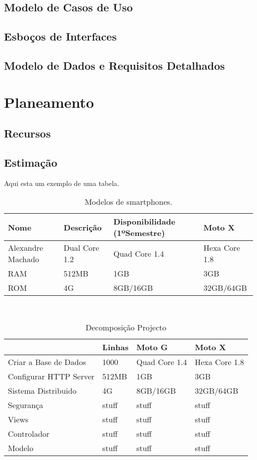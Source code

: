 \documentclass[12pt, a4paper, twoside]{report} %
\begin{document}
\section{Modelo de Casos de Uso}

\section{Esboços de Interfaces}

\section{Modelo de Dados e Requisitos Detalhados}

\chapter{Planeamento}

\section{Recursos}

\section{Estimação}

Aqui esta um exemplo de uma tabela.

\begin{table}[h]
\centering
\begin{tabular}{|l|l|l|l|}
\hline
{Nome} & {Descrição} & {Disponibilidade} (1ºSemestre) & {Moto X}\\ \hline
{Alexandre Machado} & Dual Core 1.2 & Quad Core 1.4 & Hexa Core 1.8\\ \hline
{RAM} & 512MB & 1GB & 3GB\\ \hline
{ROM} & 4G & 8GB/16GB & 32GB/64GB\\ \hline
\end{tabular} \\
\caption{Modelos de smartphones.}
\end{table}

\begin{table}[h]
\centering
\begin{tabular}{|l|l|l|l|}
\hline
& {Linhas} & {Moto G} & {Moto X}\\ \hline
{Criar a Base de Dados} & 1000 & Quad Core 1.4 & Hexa Core 1.8\\ \hline
{Configurar HTTP Server} & 512MB & 1GB & 3GB\\ \hline
{Sistema Distribuido} & 4G & 8GB/16GB & 32GB/64GB\\ \hline
{Segurança} & stuff & stuff & stuff \\ \hline
{Views} & stuff & stuff & stuff \\ \hline
{Controlador} & stuff & stuff & stuff \\ \hline
{Modelo} & stuff & stuff & stuff \\ \hline
\end{tabular} \\
\caption{Decomposição Projecto}
\end{table}
\end{document}

